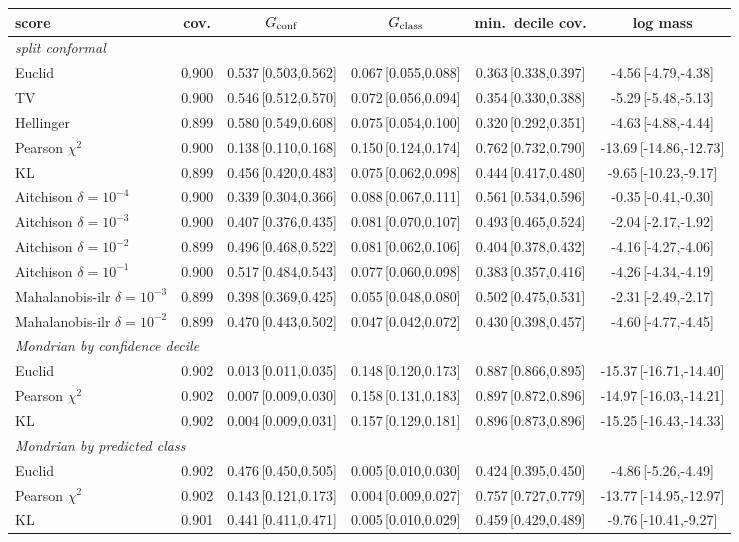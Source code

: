 \begin{tabular}{lccccc}\toprule
score & cov. & $G_{\rm conf}$ & $G_{\rm class}$ & min.\ decile cov. & log mass\\\midrule
\multicolumn{6}{l}{\emph{split conformal}}\\
Euclid & 0.900 & 0.537\,[0.503,0.562] & 0.067\,[0.055,0.088] & 0.363\,[0.338,0.397] & -4.56\,[-4.79,-4.38]\\
TV & 0.900 & 0.546\,[0.512,0.570] & 0.072\,[0.056,0.094] & 0.354\,[0.330,0.388] & -5.29\,[-5.48,-5.13]\\
Hellinger & 0.899 & 0.580\,[0.549,0.608] & 0.075\,[0.054,0.100] & 0.320\,[0.292,0.351] & -4.63\,[-4.88,-4.44]\\
Pearson $\chi^2$ & 0.900 & 0.138\,[0.110,0.168] & 0.150\,[0.124,0.174] & 0.762\,[0.732,0.790] & -13.69\,[-14.86,-12.73]\\
KL & 0.899 & 0.456\,[0.420,0.483] & 0.075\,[0.062,0.098] & 0.444\,[0.417,0.480] & -9.65\,[-10.23,-9.17]\\
Aitchison $\delta{=}10^{-4}$ & 0.900 & 0.339\,[0.304,0.366] & 0.088\,[0.067,0.111] & 0.561\,[0.534,0.596] & -0.35\,[-0.41,-0.30]\\
Aitchison $\delta{=}10^{-3}$ & 0.900 & 0.407\,[0.376,0.435] & 0.081\,[0.070,0.107] & 0.493\,[0.465,0.524] & -2.04\,[-2.17,-1.92]\\
Aitchison $\delta{=}10^{-2}$ & 0.899 & 0.496\,[0.468,0.522] & 0.081\,[0.062,0.106] & 0.404\,[0.378,0.432] & -4.16\,[-4.27,-4.06]\\
Aitchison $\delta{=}10^{-1}$ & 0.900 & 0.517\,[0.484,0.543] & 0.077\,[0.060,0.098] & 0.383\,[0.357,0.416] & -4.26\,[-4.34,-4.19]\\
Mahalanobis-ilr $\delta{=}10^{-3}$ & 0.899 & 0.398\,[0.369,0.425] & 0.055\,[0.048,0.080] & 0.502\,[0.475,0.531] & -2.31\,[-2.49,-2.17]\\
Mahalanobis-ilr $\delta{=}10^{-2}$ & 0.899 & 0.470\,[0.443,0.502] & 0.047\,[0.042,0.072] & 0.430\,[0.398,0.457] & -4.60\,[-4.77,-4.45]\\
\multicolumn{6}{l}{\emph{Mondrian by confidence decile}}\\
Euclid & 0.902 & 0.013\,[0.011,0.035] & 0.148\,[0.120,0.173] & 0.887\,[0.866,0.895] & -15.37\,[-16.71,-14.40]\\
Pearson $\chi^2$ & 0.902 & 0.007\,[0.009,0.030] & 0.158\,[0.131,0.183] & 0.897\,[0.872,0.896] & -14.97\,[-16.03,-14.21]\\
KL & 0.902 & 0.004\,[0.009,0.031] & 0.157\,[0.129,0.181] & 0.896\,[0.873,0.896] & -15.25\,[-16.43,-14.33]\\
\multicolumn{6}{l}{\emph{Mondrian by predicted class}}\\
Euclid & 0.902 & 0.476\,[0.450,0.505] & 0.005\,[0.010,0.030] & 0.424\,[0.395,0.450] & -4.86\,[-5.26,-4.49]\\
Pearson $\chi^2$ & 0.902 & 0.143\,[0.121,0.173] & 0.004\,[0.009,0.027] & 0.757\,[0.727,0.779] & -13.77\,[-14.95,-12.97]\\
KL & 0.901 & 0.441\,[0.411,0.471] & 0.005\,[0.010,0.029] & 0.459\,[0.429,0.489] & -9.76\,[-10.41,-9.27]\\
\bottomrule\end{tabular}
